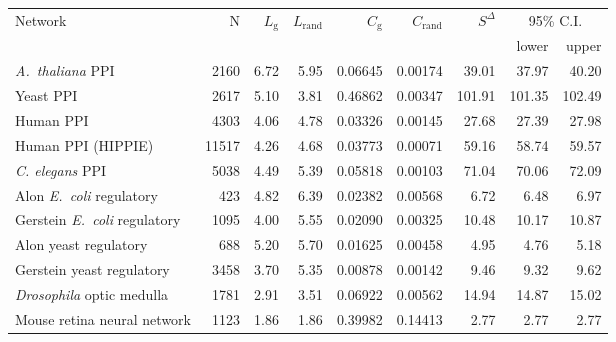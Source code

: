 \begin{tabular}{lrrrrrrrr}
\hline
Network & N  & $L_{\mathrm{g}}$ & $L_{\mathrm{rand}}$ & $C_{\mathrm{g}}$ & $C_{\mathrm{rand}}$ &  $S^{\Delta}$ & \multicolumn{2}{c}{95\% C.I.}\\
        &    &                   &                      &                   &                      &             &  lower   & upper \\
\hline
\textit{A.~thaliana} PPI & 2160 & 6.72 & 5.95 & 0.06645 & 0.00174 & 39.01 & 37.97 & 40.20\\
Yeast PPI & 2617 & 5.10 & 3.81 & 0.46862 & 0.00347 & 101.91 & 101.35 & 102.49\\
Human PPI & 4303 & 4.06 & 4.78 & 0.03326 & 0.00145 & 27.68 & 27.39 & 27.98\\
Human PPI (HIPPIE) & 11517 & 4.26 & 4.68 & 0.03773 & 0.00071 & 59.16 & 58.74 & 59.57\\
\textit{C. elegans} PPI & 5038 & 4.49 & 5.39 & 0.05818 & 0.00103 & 71.04 & 70.06 & 72.09\\
Alon \textit{E.~coli} regulatory & 423 & 4.82 & 6.39 & 0.02382 & 0.00568 & 6.72 & 6.48 & 6.97\\
Gerstein \textit{E.~coli} regulatory & 1095 & 4.00 & 5.55 & 0.02090 & 0.00325 & 10.48 & 10.17 & 10.87\\
Alon yeast regulatory & 688 & 5.20 & 5.70 & 0.01625 & 0.00458 & 4.95 & 4.76 & 5.18\\
Gerstein yeast regulatory & 3458 & 3.70 & 5.35 & 0.00878 & 0.00142 & 9.46 & 9.32 & 9.62\\
\textit{Drosophila} optic medulla & 1781 & 2.91 & 3.51 & 0.06922 & 0.00562 & 14.94 & 14.87 & 15.02\\
Mouse retina neural network & 1123 & 1.86 & 1.86 & 0.39982 & 0.14413 & 2.77 & 2.77 & 2.77\\
\hline
\end{tabular}
